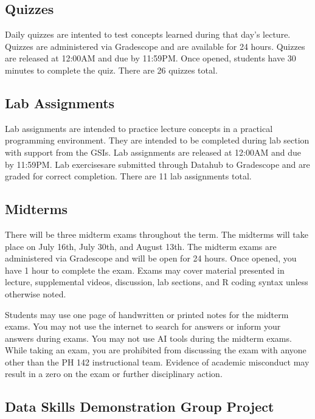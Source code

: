\documentclass[11pt]{article}
\begin{document}
\subsection*{Quizzes}

Daily quizzes are intented to test concepts learned during that day's lecture. 
Quizzes are administered via Gradescope and are available for 24 hours. Quizzes 
are released at 12:00AM and due by 11:59PM. Once opened, students have 30 minutes
to complete the quiz. There are 26 quizzes total. 

\subsection*{Lab Assignments}

Lab assignments are intended to practice lecture concepts in a practical
programming environment. They are intended to be completed during lab section 
with support from the GSIs. Lab assignments are released at 12:00AM and due by 
11:59PM. Lab exercisesare submitted through Datahub to Gradescope and are graded
for correct completion. There are 11 lab assignments total.

\subsection*{Midterms}

There will be three midterm exams throughout the term. The midterms will take 
place on July 16th, July 30th, and August 13th. The midterm exams are administered
via Gradescope and will be open for 24 hours. Once opened,  you have 1 hour to 
complete the exam. Exams may cover material presented in lecture, supplemental 
videos, discussion, lab sections, and R coding syntax unless otherwise noted.

Students may use one page of handwritten or printed notes for the midterm exams.
You may not use the internet to search for answers or inform your answers during exams.
You may not use AI tools during the midterm exams. While taking an exam, you 
are prohibited from discussing the exam with anyone other than the PH 142 instructional team.
Evidence of academic misconduct may result in a zero on the exam or further
disciplinary action.

\subsection*{Data Skills Demonstration Group Project}
\end{document}

